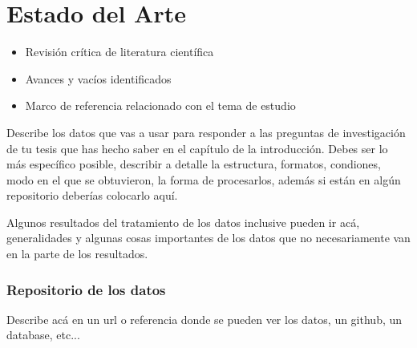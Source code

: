 \chapter{Estado del Arte} \label{sec:Marco}

\begin{itemize}
    \item Revisión crítica de literatura científica
    \item Avances y vacíos identificados
    \item Marco de referencia relacionado con el tema de estudio 
\end{itemize}


Describe los datos que vas a usar para responder a las preguntas de investigación de tu tesis que has hecho saber en el capítulo de la introducción. Debes ser lo más específico posible, describir a detalle la estructura, formatos, condiones, modo en el que se obtuvieron, la forma de procesarlos, además si están en algún repositorio deberías colocarlo aquí.

Algunos resultados del tratamiento de los datos inclusive pueden ir acá, generalidades y algunas cosas importantes de los datos que no necesariamente van en la parte de los resultados.


\subsection*{Repositorio de los datos}
Describe acá en un url o referencia donde se pueden ver los datos, un github, un database, etc...